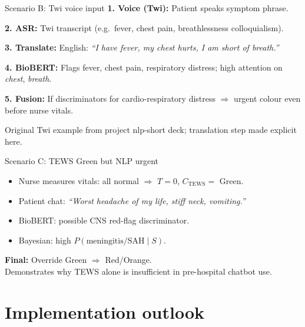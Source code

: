 \documentclass[aspectratio=169,11pt]{beamer}
\newcommand{\bcol}[2][blue!70!black]{\textcolor{#1}{#2}}
\begin{document}
\begin{frame}{Scenario B: Twi voice input}
	\textbf{1. Voice (Twi):} Patient speaks symptom phrase.

	\textbf{2. ASR:} Twi transcript (e.g.\ fever, chest pain, breathlessness colloquialism).

	\textbf{3. Translate:} English: \textit{``I have fever, my chest hurts, I am short of breath.''}

	\textbf{4. BioBERT:} Flags fever, chest pain, respiratory distress; high attention on \textit{chest}, \textit{breath}.

	\textbf{5. Fusion:} If discriminators for cardio-respiratory distress $\Rightarrow$ urgent colour even before nurse vitals.

	\vspace{0.2em}
	\footnotesize Original Twi example from project nlp-short deck; translation step made explicit here.
\end{frame}

\begin{frame}{Scenario C: TEWS Green but NLP urgent}
	\begin{itemize}
		\item Nurse measures vitals: all normal $\Rightarrow$ $T=0$, $C_{\text{TEWS}}=$ Green.
		\item Patient chat: \textit{``Worst headache of my life, stiff neck, vomiting.''}
		\item BioBERT: possible CNS red-flag discriminator.
		\item Bayesian: high $P(\text{meningitis/SAH} \mid S)$.
	\end{itemize}

	\vspace{0.3em}
	\textbf{Final:} Override Green $\Rightarrow$ \bcol[triageRed]{Red/Orange}.\\
	Demonstrates why TEWS alone is insufficient in pre-hospital chatbot use.
\end{frame}

\section{Implementation outlook}
\end{document}
